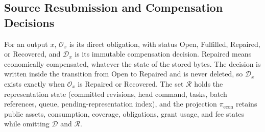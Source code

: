 \subsection{Source Resubmission and Compensation Decisions}
\label{sec:security-decision}

For an output $x$, $\mathcal O_x$ is its direct obligation, with status Open, Fulfilled, Repaired, or Recovered, and $\mathcal D_x$ is its immutable compensation decision. Repaired means economically compensated, whatever the state of the stored bytes. The decision is written inside the transition from Open to Repaired and is never deleted, so $\mathcal D_x$ exists exactly when $\mathcal O_x$ is Repaired or Recovered. The set $\mathcal R$ holds the representation state (committed revisions, head command, tasks, batch references, queue, pending-representation index), and the projection $\pi_{\mathrm{econ}}$ retains public assets, consumption, coverage, obligations, grant usage, and fee states while omitting $\mathcal D$ and $\mathcal R$.

